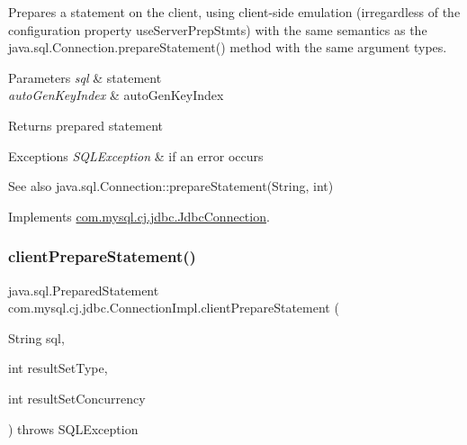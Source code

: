 Prepares a statement on the client, using client-\/side emulation (irregardless of the configuration property \textquotesingle{}use\+Server\+Prep\+Stmts\textquotesingle{}) with the same semantics as the java.\+sql.\+Connection.\+prepare\+Statement() method with the same argument types.


\begin{DoxyParams}{Parameters}
{\em sql} & statement \\
\hline
{\em auto\+Gen\+Key\+Index} & auto\+Gen\+Key\+Index \\
\hline
\end{DoxyParams}
\begin{DoxyReturn}{Returns}
prepared statement 
\end{DoxyReturn}

\begin{DoxyExceptions}{Exceptions}
{\em S\+Q\+L\+Exception} & if an error occurs \\
\hline
\end{DoxyExceptions}
\begin{DoxySeeAlso}{See also}
java.\+sql.\+Connection\+::prepare\+Statement(\+String, int) 
\end{DoxySeeAlso}


Implements \mbox{\hyperlink{interfacecom_1_1mysql_1_1cj_1_1jdbc_1_1_jdbc_connection_a1d01e4f2fd60084794906cc9a1c24c24}{com.\+mysql.\+cj.\+jdbc.\+Jdbc\+Connection}}.

\mbox{\label{classcom_1_1mysql_1_1cj_1_1jdbc_1_1_connection_impl_a08e44e57c6c4a70f6d4ea9a71b612b0e}} 
\subsubsection{\texorpdfstring{client\+Prepare\+Statement()}{clientPrepareStatement()}\hspace{0.1cm}{\footnotesize\ttfamily [3/7]}}
{\footnotesize\ttfamily java.\+sql.\+Prepared\+Statement com.\+mysql.\+cj.\+jdbc.\+Connection\+Impl.\+client\+Prepare\+Statement (\begin{DoxyParamCaption}\item[{String}]{sql,  }\item[{int}]{result\+Set\+Type,  }\item[{int}]{result\+Set\+Concurrency }\end{DoxyParamCaption}) throws S\+Q\+L\+Exception}


